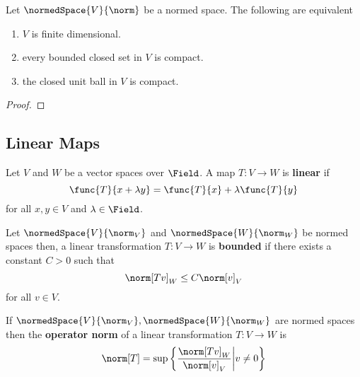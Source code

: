 \begin{theorem}
    Let \(\normedSpace{V}{\norm}\) be a normed space. The following are equivalent
    \begin{enumerate}
        \item \(V\) is finite dimensional.
        \item every bounded closed set in \(V\) is compact.
        \item the closed unit ball in \(V\) is compact.
    \end{enumerate}
\end{theorem}

\begin{proof}

\end{proof}

\subsection{Linear Maps}
Let \(V\) and \(W\) be a vector spaces over \(\Field\). A map \(T: V \to W\) is \textbf{linear} if
\begin{equation*}
    \func{T}{x + \lambda y} = \func{T}{x} + \lambda \func{T}{y}
\end{equation*}
for all \(x,y \in V\) and \(\lambda \in \Field\).

\begin{definition}
    Let \(\normedSpace{V}{\norm_V}\) and \(\normedSpace{W}{\norm_W}\) be normed spaces then, a linear transformation \(T : V \to W\) is \textbf{bounded} if there exists a constant \(C > 0\) such that
    \begin{equation*}
        \norm[Tv]_W \leq C \norm[v]_V
    \end{equation*}
    for all \(v \in V\).
\end{definition}

\begin{definition}
    If \(\normedSpace{V}{\norm_V},\normedSpace{W}{\norm_W}\) are normed spaces then the \textbf{operator norm} of a linear transformation \(T : V \to W\) is
    \begin{equation*}
        \norm[T] = \sup \left\{\dfrac{\norm[Tv]_W}{\norm[v]_V} \middle| v \neq 0 \right\}
    \end{equation*}
\end{definition}

